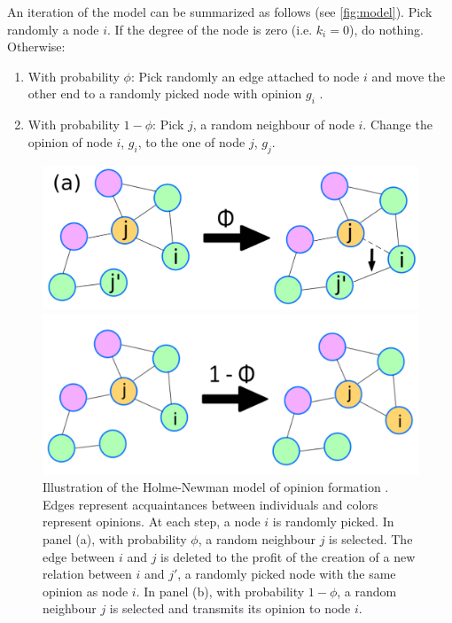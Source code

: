 \documentclass[11pt]{article}
\begin{document}
An iteration of the model can be summarized as follows (see \autoref{fig:model}). Pick randomly a node $i$. If the degree of the node is zero (i.e. $k_i=0$), do nothing. Otherwise: 
\begin{enumerate}
    \item With probability $\phi$: Pick randomly an edge attached to node $i$ and move the other end to a randomly picked node with opinion $g_i$ .
     \item With probability $1-\phi$: Pick $j$, a random neighbour of node $i$. Change the opinion of node $i$, $g_i$, to the one of node $j$, $g_j$.
\end{enumerate}
\begin{figure}
\centering
\begin{minipage}{.5\textwidth}
  \centering
  \includegraphics[width=0.9\linewidth]{figures/phi.PNG}
\end{minipage}%
\begin{minipage}{.5\textwidth}
  \centering
  \includegraphics[width=0.9\linewidth]{figures/1-phi.PNG}
\end{minipage}
\caption{Illustration of the Holme-Newman model of opinion formation \citep{Holme2006}. Edges represent acquaintances between individuals and colors represent opinions. At each step, a node $i$ is randomly picked. In panel (a), with probability $\phi$,  a random neighbour $j$ is selected. The edge between $i$ and $j$ is deleted to the profit of the creation of a new relation between $i$ and $j'$, a randomly picked node with the same opinion as node $i$. In panel (b),  with probability $1 - \phi$, a random neighbour $j$ is selected and transmits its opinion to node $i$.}
    \label{fig:model}
\end{figure}
\end{document}
